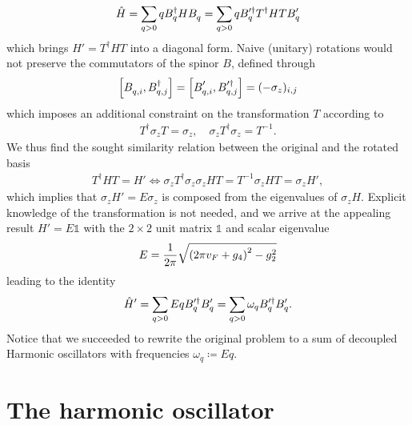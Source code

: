\begin{align}
    \hat H = \sum_{q>0} qB^\dag_q H B^\pdag_q = \sum_{q>0} qB'^\dag_q T^\dag H T B'^\pdag_q
\end{align}
which brings $H' = T^\dag H T$ into a diagonal form.
Naive (unitary) rotations would not preserve the commutators of the spinor $B$, defined through
\begin{align}
    \commutator{B_{q,i}^\pdag,B^\dag_{q,j}} = \commutator{B_{q,i}'^\pdag,B'^\dag_{q,j}} = (-\sigma_z)_{i,j}
\end{align}
which imposes an additional constraint on the transformation $T$ according to
\begin{align}
    T^\dag\sigma_z T = \sigma_z,
    \quad
    \sigma_z T^\dag\sigma_z = T^{-1}.
\end{align}
We thus find the sought similarity relation between the original and the rotated basis
\begin{align}
    T^\dag HT = H' \Leftrightarrow \sigma_z T^\dag\sigma_z\sigma_z H T = T^{-1}\sigma_z H T = \sigma_z H',
\end{align}
which implies that $\sigma_z H'=E\sigma_z$ is composed from the eigenvalues of $\sigma_z H$.
Explicit knowledge of the transformation is not needed, and we arrive at the appealing result $H' = E\mathbb1$ with the $2\times2$ unit matrix $\mathbb1$ and scalar eigenvalue
\begin{align}
    E = \frac1{2\pi}\sqrt{\left( 2\pi v_F + g_4 \right)^2 - g_2^2}
\end{align}
leading to the identity
\begin{align}
    \hat H' = \sum_{q>0} Eq B'^\dag_q B'^\pdag_q = \sum_{q>0} \omega_q B'^\dag_q B'^\pdag_q.
\end{align}
Notice that we succeeded to rewrite the original problem to a sum of decoupled Harmonic oscillators with frequencies $\omega_q\coloneqq Eq$.
%
%
\section{The harmonic oscillator}
\label{sec:the_harmonic_oscillator}




